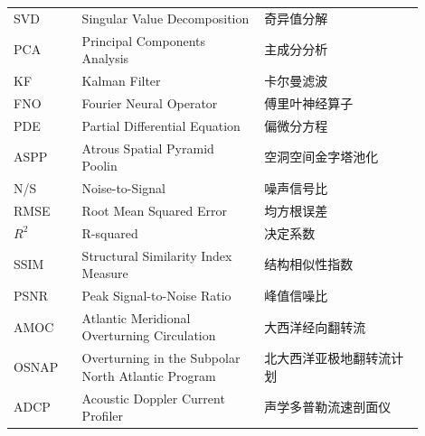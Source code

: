 \begin{abbreviation}
\begin{longtable}{>{\centering\arraybackslash}m{0.15\linewidth}>{\centering\arraybackslash}m{0.4\linewidth}>{\centering\arraybackslash}m{0.35\linewidth}}
     SVD &Singular Value Decomposition   &  奇异值分解  \\
    PCA  &  Principal Components Analysis &   主成分分析 \\
     KF&Kalman Filter   &    卡尔曼滤波\\
      FNO& Fourier Neural Operator  &傅里叶神经算子    \\
      PDE& Partial Differential Equation  &  偏微分方程  \\
      ASPP & Atrous Spatial Pyramid Poolin &空洞空间金字塔池化\\
      N/S & Noise-to-Signal & 噪声信号比\\
      RMSE&Root Mean Squared Error&均方根误差\\
    $R^{2}$&R-squared&决定系数\\
      SSIM & Structural Similarity Index Measure&结构相似性指数\\
      PSNR & Peak Signal-to-Noise Ratio&峰值信噪比\\
    AMOC & Atlantic Meridional Overturning Circulation & 大西洋经向翻转流\\
    OSNAP& Overturning in the Subpolar North Atlantic Program & 北大西洋亚极地翻转流计划\\
    ADCP & Acoustic Doppler Current Profiler & 声学多普勒流速剖面仪\\
\end{longtable}



\end{abbreviation}
